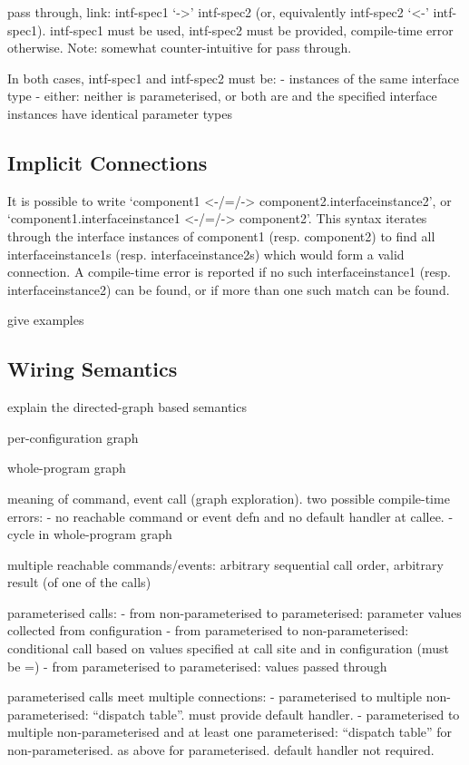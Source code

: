 \documentclass[11pt]{article}
\begin{document}
pass through, link: intf-spec1 `->' intf-spec2 (or, equivalently
intf-spec2 `<-' intf-spec1). intf-spec1 must be used, intf-spec2
must be provided, compile-time error otherwise. Note: somewhat
counter-intuitive for pass through.

In both cases, intf-spec1 and intf-spec2 must be:
- instances of the same interface type
- either: neither is parameterised, or both are and the specified interface
instances have identical parameter types

\subsection{Implicit Connections}

It is possible to write `component1 <-/=/-> component2.interfaceinstance2',
or `component1.interfaceinstance1 <-/=/-> component2'. This syntax iterates
through the interface instances of component1 (resp. component2) to find
all interfaceinstance1s (resp. interfaceinstance2s) which would form a
valid connection. A compile-time error is reported if no such
interfaceinstance1 (resp. interfaceinstance2) can be found, or if more
than one such match can be found.

give examples

\subsection{Wiring Semantics}
\label{sec:wiring}

explain the directed-graph based semantics

per-configuration graph

whole-program graph

meaning of command, event call (graph exploration). two possible
compile-time errors: 
- no reachable command or event defn and no default handler at callee.
- cycle in whole-program graph

multiple reachable commands/events: arbitrary sequential call order,
arbitrary result (of one of the calls) 

parameterised calls:
- from non-parameterised to parameterised: parameter values collected
from configuration
- from parameterised to non-parameterised: conditional call based on
values specified at call site and in configuration (must be =)
- from parameterised to parameterised: values passed through

parameterised calls meet multiple connections:
- parameterised to multiple non-parameterised: ``dispatch table''. must
provide default handler.
- parameterised to multiple non-parameterised and at least one
parameterised: ``dispatch table'' for non-parameterised. as above
for parameterised. default handler not required.
\end{document}
